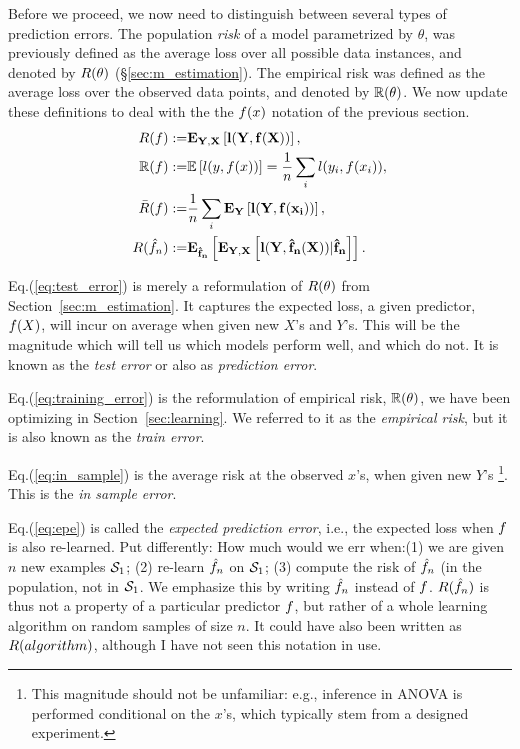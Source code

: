 Before we proceed, we now need to distinguish between several types of prediction errors.
The population \emph{risk} of a model parametrized by $\theta$, was previously defined as the average loss over all possible data instances, and denoted by $R(\theta)$ (\S \ref{sec:m_estimation}).
The empirical risk was defined as the average loss over the observed data points, and denoted by $\mathbb{R}(\theta)$.
We now update these definitions to deal with the the $f(x)$ notation of the previous section.
\begin{align}
	R(f) :=& \mathbf{E}_{\mathbf{Y,X}}\left[ \mathbf{l(Y,f(X))} \right], \label{eq:test_error} \\
	\mathbb{R}(f) :=& \mathbb{E}\left[l(y,f(x))\right] = \frac{1}{n} \sum_i l(y_i,f(x_i)),  \label{eq:training_error} \\
	\bar{R}(f) :=& \frac{1}{n} \sum_i \mathbf{E}_{\mathbf{Y}}\left[ \mathbf{l(Y,f(x_i))} \right], \label{eq:in_sample} \\
	R(\hat{f}_n) :=& \mathbf{E}_{\mathbf{\hat{f}_n}}\left[ \mathbf{
		\mathbf{E}_{\mathbf{Y,X}}\left[ \mathbf{l(Y,\hat{f}_n(X))|\hat{f}_n} \right]
	} \right].\label{eq:epe}
\end{align}

Eq.(\ref{eq:test_error}) is merely a reformulation of $R(\theta)$ from Section~\ref{sec:m_estimation}.
It captures the expected loss, a given predictor, $f(X)$, will incur on average when given new $X$'s and $Y$'s.
This will be the magnitude which will tell us which models perform well, and which do not.
It is known as the \emph{test error} or also as \emph{prediction error}.

Eq.(\ref{eq:training_error}) is the reformulation of empirical risk, $\mathbb{R}(\theta)$, we have been optimizing in Section~\ref{sec:learning}.
We referred to it as the \emph{empirical risk}, but it is also known as the \emph{train error}.

Eq.(\ref{eq:in_sample}) is the average risk at the observed $x$'s, when given new $Y$'s \footnote{This magnitude should not be unfamiliar: e.g., inference in ANOVA is performed conditional on the $x$'s, which typically stem from a designed experiment.}.
This is the \emph{in sample error}.

Eq.(\ref{eq:epe}) is called the \emph{expected prediction error}, i.e., the expected loss when $f$ is also re-learned. 
Put differently: How much would we err when:(1) we are given $n$ new examples $\mathcal{S}_1$; (2) re-learn $\hat{f}_n$ on $\mathcal{S}_1$; (3) compute the risk of $\hat{f}_n$ (in the population, not in $\mathcal{S}_1$.
We emphasize this by writing $\hat{f}_n$ instead of $f$.
$R(\hat{f}_n)$ is thus not a property of a particular predictor $f$, but rather of a whole learning algorithm on random samples of size $n$.
It could have also been written as $R(algorithm)$, although I have not seen this notation in use.


